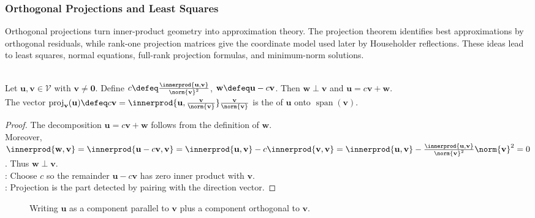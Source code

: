 \subsubsection{Orthogonal Projections and Least Squares}

Orthogonal projections turn inner-product geometry into approximation theory. The projection theorem identifies best approximations by orthogonal residuals, while rank-one projection matrices give the coordinate model used later by Householder reflections. These ideas lead to least squares, normal equations, full-rank projection formulas, and minimum-norm solutions.

\begin{proposition} \label{prop:orthogonal-projection-onto-line}\label{prop:orthogonal-decomposition-one-vector} \\
Let $\mathbf{u},\mathbf{v}\in\mathcal{V}$ with $\mathbf{v}\neq\mathbf{0}$. Define $c\defeq\frac{\innerprod{\mathbf{u},\mathbf{v}}}{\norm{\mathbf{v}}^2}$, $\mathbf{w}\defeq\mathbf{u}-c\mathbf{v}$. Then $\mathbf{w}\perp\mathbf{v}$ and $\mathbf{u}=c\mathbf{v}+\mathbf{w}$.\\
The vector $\operatorname{proj}_{\mathbf{v}}(\mathbf{u})\defeq c\mathbf{v} =\innerprod{\mathbf{u},\frac{\mathbf{v}}{\norm{\mathbf{v}}}}\frac{\mathbf{v}}{\norm{\mathbf{v}}}$ is the  of $\mathbf{u}$ onto $\operatorname{span}(\mathbf{v})$.
\begin{proof}
The decomposition $\mathbf{u}=c\mathbf{v}+\mathbf{w}$ follows from the definition of $\mathbf{w}$.\\
Moreover, $\innerprod{\mathbf{w},\mathbf{v}} =\innerprod{\mathbf{u}-c\mathbf{v},\mathbf{v}} =\innerprod{\mathbf{u},\mathbf{v}}-c\innerprod{\mathbf{v},\mathbf{v}} =\innerprod{\mathbf{u},\mathbf{v}} -\frac{\innerprod{\mathbf{u},\mathbf{v}}}{\norm{\mathbf{v}}^2}\norm{\mathbf{v}}^2 =0$. Thus $\mathbf{w}\perp\mathbf{v}$.\\
: Choose $c$ so the remainder $\mathbf{u}-c\mathbf{v}$ has zero inner product with $\mathbf{v}$.\\
: Projection is the part detected by pairing with the direction vector.
\end{proof}
\end{proposition}

\begin{figure}[H]
  \centering
  
  \caption{Writing $\mathbf{u}$ as a component parallel to $\mathbf{v}$ plus a component orthogonal to $\mathbf{v}$.}
  \label{fig:orthogonal-decomposition-one-vector}
\end{figure}

